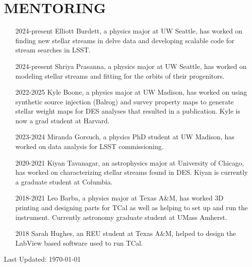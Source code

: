 \documentclass[11pt,letterpaper, sans]{moderncv}        %
\begin{document}
\section{MENTORING}
\begin{itemize} [itemsep=1pt, leftmargin=65pt]
    \item [2024-present] Elliott Burdett, a physics major at UW Seattle, has worked on finding new stellar streams in delve data and developing scalable code for stream searches in LSST.
    \item [2024-present] Shriya Prasanna, a physics major at UW Seattle, has worked on modeling stellar streams and fitting for the orbits of their progenitors.
    \item [2022-2025] Kyle Boone, a physics major at UW Madison, has worked on using synthetic source injection (Balrog) and survey property maps to generate stellar weight maps for DES analyses that resulted in a publication. Kyle is now a grad student at Harvard. 
    \item [2023-2024] Miranda Gorsuch, a physics PhD student at UW Madison, has worked on data analysis for LSST commissioning.
    \item [2020-2021] Kiyan Tavanagar, an astrophysics major at University of Chicago, has worked on characterizing stellar streams found in DES. Kiyan is currently a graduate student at Columbia.   
    \item [2018-2021] Leo Barba, a physics major at Texas A\&M, has worked 3D printing and designing parts for TCal as well as helping to set up and run the instrument. Currently astronomy graduate student at UMass Amherst.  
    \item [2018] Sarah Hughes, an REU student at Texas A\&M, helped to design the LabView based software used to run TCal.  
\end{itemize}

\vfill
\begin{center}
    Last Updated: \monthyeardate\today
\end{center}
{\centering }
% 
\end{document}
